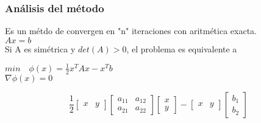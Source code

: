 \subsubsection{An\'alisis del m\'etodo}
Es un m\'etdo de convergen en "n" iteraciones con aritm\'etica exacta.\\
$Ax=b$\\
Si A es sim\'etrica y $det(A)>0$, el problema es equivalente a\\
\begin{center}
$min\quad \phi(x)=\frac{1}{2}x^TAx-x^Tb$\\ $\nabla\phi(x)=0$
\end{center}
\begin{displaymath}
\frac{1}{2}\begin{bmatrix}
x & y \end{bmatrix}\begin{bmatrix}
a_{11} & a_{12} \\ a_{21} & a_{22}\end{bmatrix}\begin{bmatrix}
x\\y \end{bmatrix}-\begin{bmatrix}
x & y \end{bmatrix}\begin{bmatrix}
b_1 \\ b_2 \end{bmatrix}
\end{displaymath}

